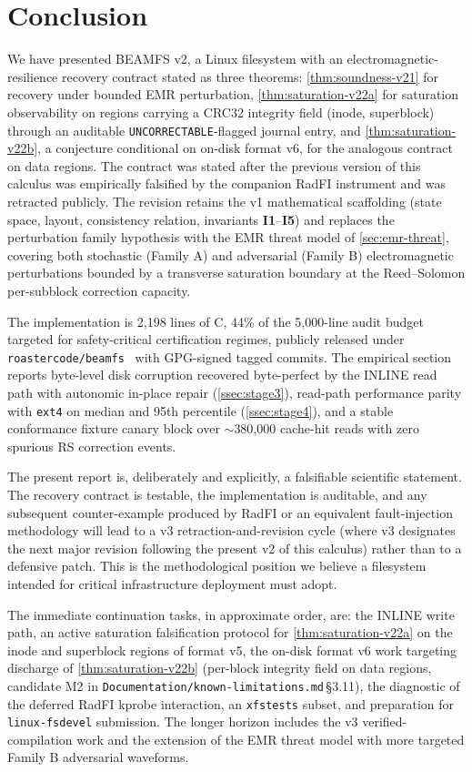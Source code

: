 \section{Conclusion}\label{sec:conclusion}

We have presented BEAMFS v2, a Linux filesystem with an
electromagnetic-resilience recovery contract stated as three
theorems: \cref{thm:soundness-v21} for recovery under bounded
EMR perturbation, \cref{thm:saturation-v22a} for saturation
observability on regions carrying a CRC32 integrity field
(inode, superblock) through an auditable
\texttt{UNCORRECTABLE}-flagged journal entry, and
\cref{thm:saturation-v22b}, a conjecture conditional on on-disk
format v6, for the analogous contract on data regions. The contract was
stated after the previous version of this calculus was empirically
falsified by the companion RadFI instrument and was retracted
publicly. The revision retains the v1 mathematical scaffolding
(state space, layout, consistency relation, invariants
\textbf{I1}--\textbf{I5}) and replaces the perturbation family
hypothesis with the EMR threat model of \cref{sec:emr-threat},
covering both stochastic (Family A) and adversarial (Family B)
electromagnetic perturbations bounded by a transverse saturation
boundary at the Reed--Solomon per-subblock correction capacity.

The implementation is 2{,}198 lines of C, 44\% of the 5{,}000-line
audit budget targeted for safety-critical certification regimes,
publicly released under
\texttt{roastercode/beamfs}~\cite{beamfs-impl} with GPG-signed
tagged commits. The empirical section reports byte-level disk
corruption recovered byte-perfect by the INLINE read path with
autonomic in-place repair (\cref{ssec:stage3}), read-path
performance parity with \texttt{ext4} on median and 95th
percentile (\cref{ssec:stage4}), and a stable conformance
fixture canary block over \(\sim\)380{,}000 cache-hit reads with
zero spurious RS correction events.

The present report is, deliberately and explicitly, a
falsifiable scientific statement. The recovery contract is
testable, the implementation is auditable, and any subsequent
counter-example produced by RadFI or an equivalent fault-injection
methodology will lead to a v3 retraction-and-revision cycle
(where v3 designates the next major revision following the
present v2 of this calculus) rather than to a defensive patch. This is the methodological
position we believe a filesystem intended for critical
infrastructure deployment must adopt.

The immediate continuation tasks, in approximate order, are: the
INLINE write path, an active saturation falsification protocol
for \cref{thm:saturation-v22a} on the inode and superblock
regions of format v5, the on-disk format v6 work targeting
discharge of \cref{thm:saturation-v22b} (per-block integrity
field on data regions, candidate M2 in
\texttt{Documentation/known-limitations.md}\,\S3.11), the
diagnostic of the deferred RadFI kprobe interaction, an
\texttt{xfstests} subset, and preparation for
\texttt{linux-fsdevel} submission. The longer
horizon includes the v3 verified-compilation work and the
extension of the EMR threat model with more targeted Family B
adversarial waveforms.

